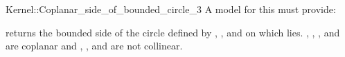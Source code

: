 \begin{ccRefFunctionObjectConcept}{Kernel::Coplanar_side_of_bounded_circle_3}
A model for this must provide:


         {returns the bounded side of the circle defined
          by , , and  on which  lies.
          \ccPrecond {}, , , and  are coplanar and
          , , and  are not collinear.}

\ccIsModel{}

\end{ccRefFunctionObjectConcept}

